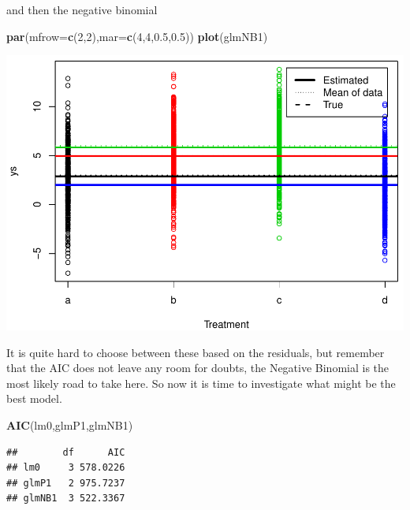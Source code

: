 \documentclass[
]{book}
\newenvironment{Shaded}{\begin{snugshade}}{\end{snugshade}}
\newcommand{\AttributeTok}[1]{\textcolor[rgb]{0.13,0.29,0.53}{#1}}
\newcommand{\DecValTok}[1]{\textcolor[rgb]{0.00,0.00,0.81}{#1}}
\newcommand{\FloatTok}[1]{\textcolor[rgb]{0.00,0.00,0.81}{#1}}
\newcommand{\FunctionTok}[1]{\textcolor[rgb]{0.13,0.29,0.53}{\textbf{#1}}}
\newcommand{\NormalTok}[1]{#1}
\begin{document}
and then the negative binomial

\begin{Shaded}
\begin{Highlighting}[]
\FunctionTok{par}\NormalTok{(}\AttributeTok{mfrow=}\FunctionTok{c}\NormalTok{(}\DecValTok{2}\NormalTok{,}\DecValTok{2}\NormalTok{),}\AttributeTok{mar=}\FunctionTok{c}\NormalTok{(}\DecValTok{4}\NormalTok{,}\DecValTok{4}\NormalTok{,}\FloatTok{0.5}\NormalTok{,}\FloatTok{0.5}\NormalTok{))}
\FunctionTok{plot}\NormalTok{(glmNB1)}
\end{Highlighting}
\end{Shaded}

\includegraphics{ECOMODbook_files/figure-latex/unnamed-chunk-81-1.pdf}

It is quite hard to choose between these based on the residuals, but remember that the AIC does not leave any room for doubts, the Negative Binomial is the most likely road to take here. So now it is time to investigate what might be the best model.

\begin{Shaded}
\begin{Highlighting}[]
\FunctionTok{AIC}\NormalTok{(lm0,glmP1,glmNB1)}
\end{Highlighting}
\end{Shaded}

\begin{verbatim}
##        df      AIC
## lm0     3 578.0226
## glmP1   2 975.7237
## glmNB1  3 522.3367
\end{verbatim}
\end{document}
